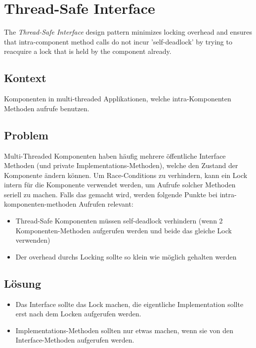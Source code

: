 \section{Thread-Safe Interface}


The \emph{Thread-Safe Interface} design pattern minimizes locking overhead and ensures that intra-component method calls do not incur 'self-deadlock' by trying to reacquire a lock that is held by the component already.

\subsection{Kontext}

Komponenten in multi-threaded Applikationen, welche intra-Komponenten Methoden aufrufe benutzen.

\subsection{Problem}

Multi-Threaded Komponenten haben häufig mehrere öffentliche Interface Methoden (und private Implementations-Methoden), welche den Zustand der Komponente ändern können.
Um Race-Conditions zu verhindern, kann ein Lock intern für die Komponente verwendet werden, um Aufrufe solcher Methoden seriell zu machen.
Falls das gemacht wird, werden folgende Punkte bei intra-komponenten-methoden Aufrufen relevant:

\begin{itemize}
	\item Thread-Safe Komponenten müssen self-deadlock verhindern (wenn 2 Komponenten-Methoden aufgerufen werden und beide das gleiche Lock verwenden)
	\item Der overhead durchs Locking sollte so klein wie möglich gehalten werden
\end{itemize}

\subsection{Lösung}

\begin{itemize}
	\item Das Interface sollte das Lock machen, die eigentliche Implementation sollte erst nach dem Locken aufgerufen werden.
	\item Implementations-Methoden sollten nur etwas machen, wenn sie von den Interface-Methoden aufgerufen werden.
\end{itemize}

